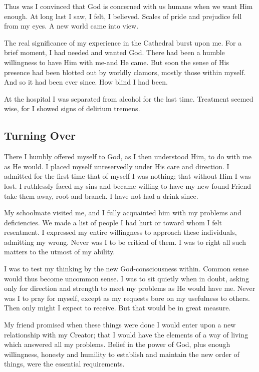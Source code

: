 Thus was I convinced that God is concerned with us humans when we want Him enough.
At long last I saw, I felt, I believed.
Scales of pride and prejudice fell from my eyes.
A new world came into view.

The real significance of my experience in the Cathedral burst upon me.
For a brief moment, I had needed and wanted God.
There had been a humble willingness to have Him with me-and He came.
But soon the sense of His presence had been blotted out by worldly clamors, mostly those within myself.
And so it had been ever since.
How blind I had been.

At the hospital I was separated from alcohol for the last time.
Treatment seemed wise, for I showed signs of delirium tremens.


\subsection{Turning Over}

There I humbly offered myself to God, as I then understood Him, to do with me as He would.
I placed myself unreservedly under His care and direction.
I admitted for the first time that of myself I was nothing; that without Him I was lost.
I ruthlessly faced my sins and became willing to have my new-found Friend take them away, root and branch.
I have not had a drink since.

My schoolmate visited me, and I fully acquainted him with my problems and deficiencies.
We made a list of people I had hurt or toward whom I felt resentment.
I expressed my entire willingness to approach these individuals, admitting my wrong.
Never was I to be critical of them.
I was to right all such matters to the utmost of my ability.

I was to test my thinking by the new God-consciousness within.
Common sense would thus become uncommon sense.
I was to sit quietly when in doubt, asking only for direction and strength to meet my problems as He would have me.
Never was I to pray for myself, except as my requests bore on my usefulness to others.
Then only might I expect to receive.
But that would be in great measure.

My friend promised when these things were done I would enter upon a new relationship with my Creator; that I would have the elements of a way of living which answered all my problems.
Belief in the power of God, plus enough willingness, honesty and humility to establish and maintain the new order of things, were the essential requirements.

